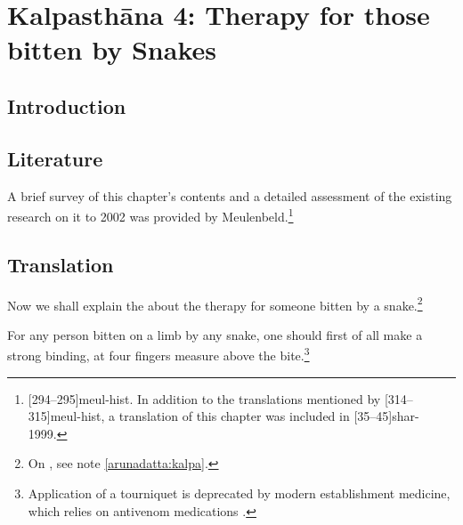 \chapter{Kalpasthāna 4: Therapy for those bitten by Snakes}

\section{Introduction} 

\section{Literature}

A brief survey of this chapter's contents and a detailed assessment of
the existing research on it to 2002 was provided by
Meulenbeld.\footnote{[294--295]{meul-hist}. In addition to the
    translations mentioned by [314--315]{meul-hist}, a translation
    of this chapter was included in [35--45]{shar-1999}.} 
    
\section{Translation}

\begin{translation}
    \item [1]
    Now we shall explain the  about the therapy for 
    someone bitten by a snake.\footnote{On , see note 
    \ref{arunadatta:kalpa}.}
    
    \item[3] For any person bitten on a limb by any snake, one should
first of all make a strong binding, at four fingers measure above the
bite.\footnote{Application of a tourniquet is deprecated by
    modern establishment medicine, which relies on antivenom medications
    \citep[e.g.,][150--151 et passim in the literature]{pill-2013}.}
    
    
    
    
\end{translation}    